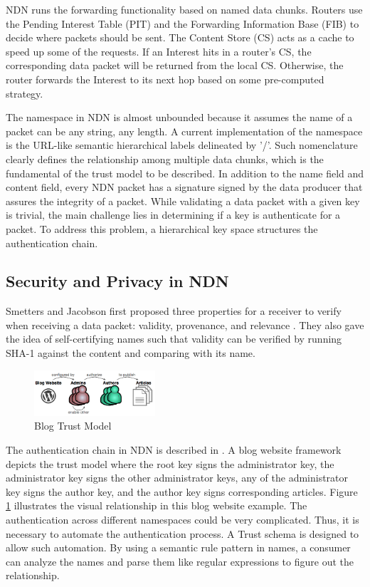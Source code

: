 \documentclass[conference,compsoc]{IEEEtran}
\begin{document}
NDN runs the forwarding functionality based on named data chunks. Routers use the Pending Interest Table (PIT) and the Forwarding Information Base (FIB) to decide where packets should be sent. The Content Store (CS) acts as a cache to speed up some of the requests. If an Interest hits in a router's CS, the corresponding data packet will be returned from the local CS. Otherwise, the router forwards the Interest to its next hop based on some pre-computed strategy.

The namespace in NDN is almost unbounded because it assumes the name of a packet can be any string, any length. A current implementation of the namespace is the URL-like semantic hierarchical labels delineated by '/'. Such nomenclature clearly defines the relationship among multiple data chunks, which is the fundamental of the trust model to be described. In addition to the name field and content field, every NDN packet has a signature signed by the data producer that assures the integrity of a packet. While validating a data packet with a given key is trivial, the main challenge lies in determining if a key is authenticate for a packet. To address this problem, a hierarchical key space structures the authentication chain.

\subsection{Security and Privacy in NDN}
Smetters and Jacobson first proposed three properties for a receiver to verify when receiving a data packet: validity, provenance, and relevance \cite{smetters2009securing}. They also gave the idea of self-certifying names such that validity can be verified by running SHA-1 against the content and comparing with its name.

\begin{figure}[!t]
    \centering
    \includegraphics[width=0.4\textwidth]{images/blog-trust-model.png}
    \caption{Blog Trust Model \cite{yuschematizing}}
    \label{fig:blog-trust-model}
\end{figure}
The authentication chain in NDN is described in \cite{yuschematizing}. A blog website framework depicts the trust model where the root key signs the administrator key, the administrator key signs the other administrator keys, any of the administrator key signs the author key, and the author key signs corresponding articles. Figure \ref{fig:blog-trust-model} illustrates the visual relationship in this blog website example. The authentication across different namespaces could be very complicated. Thus, it is necessary to automate the authentication process. A Trust schema is designed to allow such automation. By using a semantic rule pattern in names, a consumer can analyze the names and parse them like regular expressions to figure out the relationship. 
\end{document}

